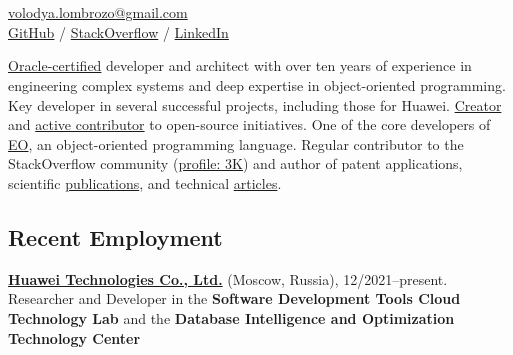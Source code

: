 \documentclass{vl}
\begin{document}
\vlPrintPhoto{}

\section*{\Large {}}

\href{mailto:volodya.lombrozo@gmail.com}{volodya.lombrozo@gmail.com}\\%
\href{https://github.com/volodya-lombrozo}{GitHub} /
\href{https://stackoverflow.com/users/10423604/volodya-lombrozo}{StackOverflow} /
\href{https://www.linkedin.com/in/vladimir-zakharov-lombrozo-b71744216/}{LinkedIn}

\vspace*{24pt}

\href{https://catalog-education.oracle.com/pls/certview/sharebadge?id=87F6A2FE819A5A5AF4120A05900AB28A461EE9A3EE9FBFA02721FADAEB3BCE19}{Oracle-certified}
developer and architect with over ten years of experience in engineering complex systems
and deep expertise in object-oriented programming.
Key developer in several successful projects, including those for Huawei.
\href{https://github.com/volodya-lombrozo?tab=repositories}{Creator} and
\href{https://github.com/volodya-lombrozo}{active contributor} to open-source initiatives.
One of the core developers of \href{https://www.eolang.org}{EO}, an object-oriented programming language.
Regular contributor to the StackOverflow community
(\href{https://stackoverflow.com/users/10423604/volodya-lombrozo}{profile: 3K}) and
author of patent applications, scientific \href{https://arxiv.org/abs/2410.05631}{publications}, and technical
\href{https://dzone.com/users/4993224/volodya-lombrozo.html}{articles}.

\subsection*{Recent Employment}

\textbf{\href{https://www.huawei.com}{Huawei Technologies Co., Ltd.}} (Moscow, Russia), 12/2021--present.
Researcher and Developer in the \textbf{Software Development Tools Cloud Technology Lab} and the
\textbf{Database Intelligence and Optimization Technology Center}
\end{document}
